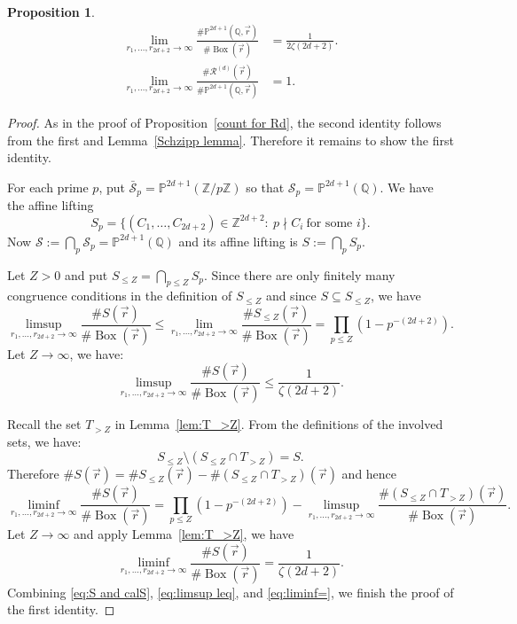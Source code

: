 \documentclass[12pt]{amsart}
\newtheorem{proposition}[theorem]{Proposition}
\newcommand{\Z}{\mathbb{Z}}
\newcommand{\Q}{\mathbb{Q}}
\newcommand{\cR}{\mathcal{R}}
\newcommand{\op}[1]{\operatorname{#1}}
\numberwithin{equation}{section}
\begin{document}
\begin{proposition}\label{prop:box Schanuel and count Rd}
    \begin{align*}
    \lim_{r_1,\ldots,r_{2d+2}\rightarrow\infty}\frac{\#\mathbb{P}^{2d+1}(\Q,\vec{r})}{\#\op{Box}(\vec{r})}&=\frac{1}{2\zeta(2d+2)}.\\
    \lim_{r_1,\ldots,r_{2d+2}\rightarrow\infty}\frac{\#\cR^{(d)}(\vec{r})}{\#\mathbb{P}^{2d+1}(\Q,\vec{r})}&=1.
    \end{align*}
\end{proposition}
\begin{proof}
    As in the proof of Proposition~\ref{count for Rd}, the second identity follows from the first and Lemma~\ref{Schzipp lemma}. Therefore it remains to show the first identity.

    For each prime $p$, put $\bar{\mathcal{S}}_p=\mathbb{P}^{2d+1}(\Z/p\Z)$
    so that $\mathcal{S}_p=\mathbb{P}^{2d+1}(\Q)$. We have
    the affine lifting
    $$S_p=\{(C_1,\ldots,C_{2d+2})\in\Z^{2d+2}:\ p\nmid C_i\ \text{for some $i$}\}.$$
    Now $\mathcal{S}:=\bigcap_{p}\mathcal{S}_p=\mathbb{P}^{2d+1}(\Q)$ and its affine lifting is $S:=\bigcap_p S_p$. 

    Let $Z>0$ and put $S_{\leq Z}=\bigcap_{p\leq Z} S_p$. Since
    there are only finitely many congruence conditions in the definition
    of $S_{\leq Z}$ and since $S\subseteq S_{\leq Z}$, we have
    $$\limsup_{r_1,\ldots,r_{2d+2}\rightarrow\infty}\frac{\# S(\vec{r})}{\#\op{Box}(\vec{r})}\leq \lim_{r_1,\ldots,r_{2d+2}\rightarrow \infty}\frac{\# S_{\leq Z}(\vec{r})}{\#\op{Box}(\vec{r})}=\prod_{p\leq Z}\left(1-p^{-(2d+2)}\right).$$
    Let $Z\rightarrow\infty$, we have:
    \begin{equation}\label{eq:limsup leq}
    \limsup_{r_1,\ldots,r_{2d+2}\rightarrow\infty}\frac{\# S(\vec{r})}{\#\op{Box}(\vec{r})}\leq\frac{1}{\zeta(2d+2)}.
    \end{equation}

    Recall the set $T_{>Z}$ in Lemma~\ref{lem:T_>Z}. From the definitions of the involved sets, we have:
    $$S_{\leq Z}\setminus (S_{\leq Z}\cap T_{>Z})=S.$$
    Therefore $\# S(\vec{r})=\# S_{\leq Z}(\vec{r})-\# (S_{\leq Z}\cap T_{>Z})(\vec{r})$ and hence
    $$\liminf_{r_1,\ldots,r_{2d+2}\rightarrow\infty}\frac{\# S(\vec{r})}{\#\op{Box}(\vec{r})}=\prod_{p\leq Z}\left(1-p^{-(2d+2)}\right)-\limsup_{r_1,\ldots,r_{2d+2}\rightarrow\infty}\frac{\# (S_{\leq Z}\cap T_{>Z})(\vec{r})}{\#\op{Box}(\vec{r})}.$$
    Let $Z\rightarrow\infty$ and apply Lemma~\ref{lem:T_>Z}, we have
    \begin{equation}\label{eq:liminf=}
        \liminf_{r_1,\ldots,r_{2d+2}\rightarrow\infty}\frac{\# S(\vec{r})}{\#\op{Box}(\vec{r})}=\frac{1}{\zeta(2d+2)}.
    \end{equation}
    Combining \eqref{eq:S and calS}, \eqref{eq:limsup leq}, and \eqref{eq:liminf=}, we finish the proof of the first identity.
\end{proof}
\end{document}

